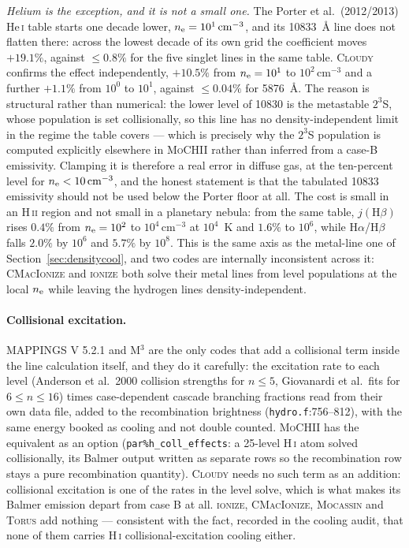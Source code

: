 \documentclass[english,a4paper]{my_memo}
\newcommand{\code}[1]{\texttt{#1}}
\newcommand{\MoCHII}{\textsc{MoCHII}}
\newcommand{\Mthree}{M$^3$}
\newcommand{\Mappings}{MAPPINGS V 5.2.1}
\newcommand{\Wood}{\textsc{ionize}}
\newcommand{\CMI}{\textsc{CMacIonize}}
\newcommand{\Torus}{\textsc{Torus}}
\newcommand{\Mocassin}{\textsc{Mocassin}}
\newcommand{\Cloudy}{\textsc{Cloudy}}
\newcommand{\HII}{H\,\textsc{ii}}
\newcommand{\nelec}{n_{\rm e}}
\begin{document}
\emph{Helium is the exception, and it is not a small one.}  The
Porter et al.\ (2012/2013) He\,\textsc{i} table starts one decade lower,
$\nelec = 10^{1}\,\mathrm{cm^{-3}}$, and its 10833~\AA{} line does not
flatten there: across the lowest decade of its own grid the coefficient moves
$+19.1\%$, against $\le 0.8\%$ for the five singlet lines in the same table.
\Cloudy{} confirms the effect independently, $+10.5\%$ from
$\nelec = 10^{1}$ to $10^{2}\,\mathrm{cm^{-3}}$ and a further $+1.1\%$ from
$10^{0}$ to $10^{1}$, against $\le 0.04\%$ for 5876~\AA{}.  The reason is
structural rather than numerical: the lower level of 10830 is the metastable
$2^3$S, whose population is set collisionally, so this line has no
density-independent limit in the regime the table covers --- which is precisely
why the $2^3$S population is computed explicitly elsewhere in \MoCHII{} rather
than inferred from a case-B emissivity.  Clamping it is therefore a real error
in diffuse gas, at the ten-percent level for $\nelec < 10\,\mathrm{cm^{-3}}$,
and the honest statement is that the tabulated 10833 emissivity should not be
used below the Porter floor at all.  The cost is small in an \HII{} region
and not small in a planetary nebula: from the same table, $j(\mathrm{H}\beta)$
rises $0.4\%$ from $\nelec = 10^2$ to $10^4\,\mathrm{cm^{-3}}$ at $10^4$~K
and $1.6\%$ to $10^6$, while H$\alpha$/H$\beta$ falls $2.0\%$ by $10^6$ and
$5.7\%$ by $10^8$.  This is the same axis as the metal-line one of
Section~\ref{sec:densitycool}, and two codes are internally inconsistent
across it: \CMI{} and \Wood{} both solve their metal lines from level
populations at the local $\nelec$ while leaving the hydrogen lines
density-independent.

\paragraph{Collisional excitation.}  \Mappings{} and \Mthree{} are the only
codes that add a collisional term inside the line calculation itself, and
they do it carefully: the excitation rate to each level (Anderson et al.\
2000 collision strengths for $n \le 5$, Giovanardi et al.\ fits for
$6 \le n \le 16$) times case-dependent cascade branching fractions read from
their own data file, added to the recombination brightness
(\code{hydro.f}:756--812), with the same energy booked as cooling and not
double counted.  \MoCHII{} has the equivalent as an option
(\code{par\%h\_coll\_effects}: a 25-level H\,\textsc{i} atom solved
collisionally, its Balmer output written as separate rows so the
recombination row stays a pure recombination quantity).  \Cloudy{} needs no such term as an addition: collisional excitation is one
of the rates in the level solve, which is what makes its Balmer emission
depart from case B at all.  \Wood{}, \CMI{},
\Mocassin{} and \Torus{} add nothing --- consistent with the fact, recorded in
the cooling audit, that none of them carries H\,\textsc{i}
collisional-excitation cooling either.
\end{document}
